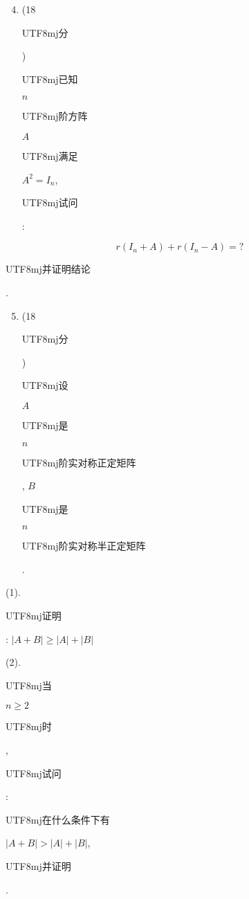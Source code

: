 \documentclass[10pt]{article}
\begin{document}
\begin{enumerate}
  \setcounter{enumi}{3}
  \item (18 \begin{CJK}{UTF8}{mj}分\end{CJK}) \begin{CJK}{UTF8}{mj}已知\end{CJK} $n$ \begin{CJK}{UTF8}{mj}阶方阵\end{CJK} $A$ \begin{CJK}{UTF8}{mj}满足\end{CJK} $A^{2}=I_{n}$, \begin{CJK}{UTF8}{mj}试问\end{CJK}:
\end{enumerate}
$$
r\left(I_{n}+A\right)+r\left(I_{n}-A\right)=?
$$
\begin{CJK}{UTF8}{mj}并证明结论\end{CJK}.

\begin{enumerate}
  \setcounter{enumi}{4}
  \item (18 \begin{CJK}{UTF8}{mj}分\end{CJK}) \begin{CJK}{UTF8}{mj}设\end{CJK} $A$ \begin{CJK}{UTF8}{mj}是\end{CJK} $n$ \begin{CJK}{UTF8}{mj}阶实对称正定矩阵\end{CJK}, $B$ \begin{CJK}{UTF8}{mj}是\end{CJK} $n$ \begin{CJK}{UTF8}{mj}阶实对称半正定矩阵\end{CJK}.
\end{enumerate}
(1). \begin{CJK}{UTF8}{mj}证明\end{CJK}: $|A+B| \geq|A|+|B|$

(2). \begin{CJK}{UTF8}{mj}当\end{CJK} $n \geq 2$ \begin{CJK}{UTF8}{mj}时\end{CJK}, \begin{CJK}{UTF8}{mj}试问\end{CJK}: \begin{CJK}{UTF8}{mj}在什么条件下有\end{CJK} $|A+B|>|A|+|B|$, \begin{CJK}{UTF8}{mj}并证明\end{CJK}.
\end{document}
